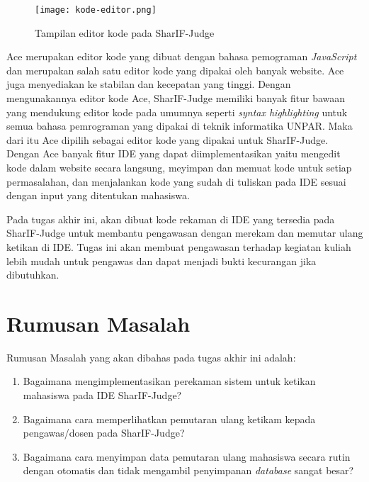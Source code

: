 \documentclass[a4paper,twoside]{article}
\begin{document}
\begin{figure}[H]
    \centering
    \texttt{[image: kode-editor.png]}
    \caption{Tampilan editor kode pada SharIF-Judge}
\end{figure}

Ace merupakan editor kode yang dibuat dengan bahasa pemograman \textit{JavaScript} dan merupakan salah satu editor kode yang dipakai oleh banyak website. Ace juga menyediakan ke stabilan dan kecepatan yang tinggi. Dengan mengunakannya editor kode Ace, SharIF-Judge memiliki banyak fitur bawaan yang mendukung editor kode pada umumnya seperti \textit{syntax highlighting} untuk semua bahasa pemrograman yang dipakai di teknik informatika UNPAR. Maka dari itu Ace dipilih sebagai editor kode yang dipakai untuk SharIF-Judge. Dengan Ace banyak fitur IDE yang dapat diimplementasikan yaitu mengedit kode dalam website secara langsung, meyimpan dan memuat kode untuk setiap permasalahan, dan menjalankan kode yang sudah di tuliskan pada IDE sesuai dengan input yang ditentukan mahasiswa. 

Pada tugas akhir ini, akan dibuat kode rekaman di IDE yang tersedia pada SharIF-Judge untuk membantu pengawasan dengan merekam dan memutar ulang ketikan di IDE. Tugas ini akan membuat pengawasan terhadap kegiatan kuliah lebih mudah untuk pengawas dan dapat menjadi bukti kecurangan jika dibutuhkan.

\section{Rumusan Masalah}
Rumusan Masalah yang akan dibahas pada tugas akhir ini adalah:
 \begin{enumerate}
     \item Bagaimana mengimplementasikan perekaman sistem untuk ketikan mahasiswa pada IDE SharIF-Judge?
     \item Bagaimana cara memperlihatkan pemutaran ulang ketikam kepada pengawas/dosen pada SharIF-Judge?
     \item Bagaimana cara menyimpan data pemutaran ulang mahasiswa secara rutin dengan otomatis dan tidak mengambil penyimpanan \textit{database} sangat besar?
 \end{enumerate}
\end{document}
